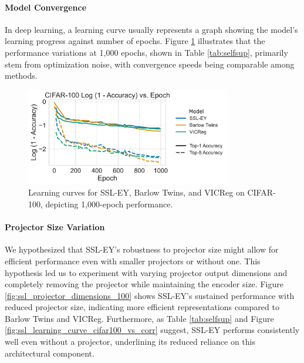 \paragraph{Model Convergence} In deep learning, a learning curve usually represents a graph showing the model's learning progress against number of epochs.
Figure \ref{fig:ssl_learning_curve_cifar100_top5} illustrates that the performance variations at 1,000 epochs, shown in Table \ref{tab:selfsup}, primarily stem from optimization noise, with convergence speeds being comparable among methods.

\begin{figure}[H]
    \centering
    \includegraphics[width=0.8\textwidth]{figures/SSL/cifar100_learning_curve_log_error}
    \caption{Learning curves for SSL-EY, Barlow Twins, and VICReg on CIFAR-100, depicting 1,000-epoch performance.}
    \label{fig:ssl_learning_curve_cifar100_top5}
\end{figure}

\paragraph{Projector Size Variation} We hypothesized that SSL-EY's robustness to projector size might allow for efficient performance even with smaller projectors or without one.
This hypothesis led us to experiment with varying projector output dimensions and completely removing the projector while maintaining the encoder size.
Figure \ref{fig:ssl_projector_dimensions_100} shows SSL-EY's sustained performance with reduced projector size, indicating more efficient representations compared to Barlow Twins and VICReg.
Furthermore, as Table \ref{tab:selfsup} and Figure \ref{fig:ssl_learning_curve_cifar100_vs_corr} suggest, SSL-EY performs consistently well even without a projector, underlining its reduced reliance on this architectural component.

